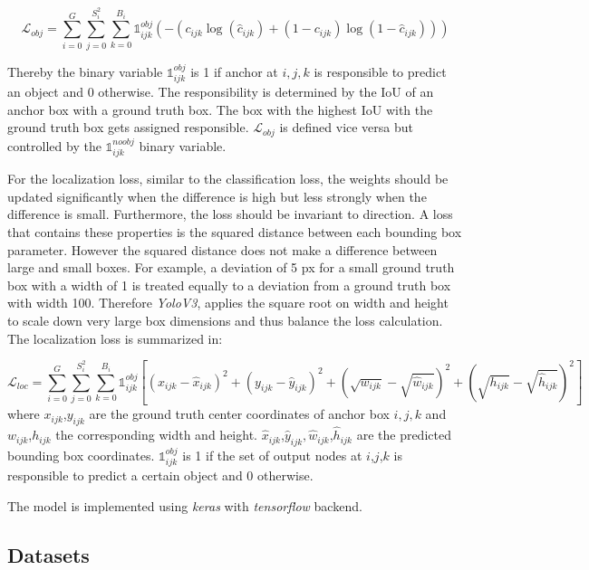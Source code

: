 	\begin{equation}
		\mathcal{L}_{obj} = \sum_{i=0}^{G}\sum_{j=0}^{S_i^2}\sum_{k=0}^{B_i} \mathbb{1}_{ijk}^{obj}(-(c_{ijk}\log(\hat c_{ijk}) + (1 - c_{ijk})\log(1 - \hat c_{ijk})))
	\end{equation}
	
	Thereby the  binary variable $\mathbb{1}_{ijk}^{obj}$ is 1 if anchor at $i,j,k$ is responsible to predict an object and 0 otherwise. The responsibility is determined by the \ac{IoU} of an anchor box with a ground truth box. The box with the highest \ac{IoU} with the ground truth box gets assigned responsible. $\mathcal{L}_{obj}$ is defined vice versa but controlled by the $\mathbb{1}_{ijk}^{noobj}$ binary variable.

	For the localization loss, similar to the classification loss, the weights should be updated significantly when the difference is high but less strongly when the difference is small. Furthermore, the loss should be invariant to direction. A loss that contains these properties is the squared distance between each bounding box parameter. However the squared distance does not make a difference between large and small boxes. For example, a deviation of 5 px for a small ground truth box with a width of 1 is treated equally to a deviation from a ground truth box with width 100. Therefore \textit{YoloV3}, applies the square root on width and height to scale down very large box dimensions and thus balance the loss calculation. The localization loss is summarized in:
	
	\begin{equation}
		\mathcal{L}_{loc} = \sum_{i=0}^{G} \sum_{j=0}^{S_i^2}\sum_{k=0}^{B_i} \mathbb{1}_{ijk}^{obj}[(x_{ijk}-\hat{x}_{ijk})^2 + (y_{ijk}-\hat{y}_{ijk})^2  + (\sqrt{w_{ijk}}-\sqrt{\hat{w}_{ijk}})^2 +(\sqrt{h_{ijk}}-\sqrt{\hat{h}_{ijk}})^2 ]
	\end{equation}
	where $x_{ijk}$,$y_{ijk}$ are the ground truth center coordinates of anchor box $i,j,k$ and $w_{ijk}$,$h_{ijk}$ the corresponding width and height. $\hat x_{ijk}$,$\hat y_{ijk}, \hat w_{ijk}$,$\hat h_{ijk}$ are the predicted bounding box coordinates. $\mathbb{1}_{ijk}^{obj}$ is 1 if the set of output nodes at $i$,$j$,$k$ is responsible to predict a certain object and 0 otherwise. 
	
	The model is implemented using \textit{keras} with \textit{tensorflow} backend. 
	
	\subsection{Datasets}
	
